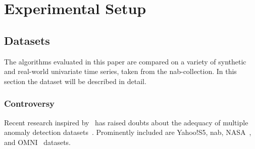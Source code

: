 \section{Experimental Setup}\label{sect:experimental-setup}


\subsection{Datasets}\label{subsect:datasets}
The algorithms evaluated in this paper are compared on a variety of synthetic
and real-world univariate time series, taken from the \gls{nab}-collection.
In this section the dataset will be described in detail.

\subsubsection{Controversy}
Recent research inspired by~\cite{Nakamura.2020} has raised doubts about the
adequacy of multiple anomaly detection datasets~\cite{Renjie.2020}. Prominently
included are Yahoo!S5, \gls{nab}, NASA~\cite{Hundman.2018}, and OMNI~\cite{Su.2019}
datasets.

